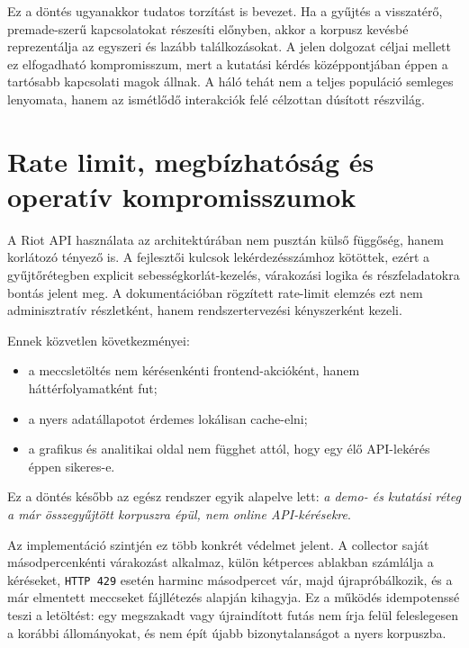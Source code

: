 ﻿\documentclass[a4paper,12pt]{report}
\begin{document}
Ez a döntés ugyanakkor tudatos torzítást is bevezet. Ha a gyűjtés a visszatérő, premade-szerű kapcsolatokat részesíti előnyben, akkor a korpusz kevésbé reprezentálja az egyszeri és lazább találkozásokat. A jelen dolgozat céljai mellett ez elfogadható kompromisszum, mert a kutatási kérdés középpontjában éppen a tartósabb kapcsolati magok állnak. A háló tehát nem a teljes populáció semleges lenyomata, hanem az ismétlődő interakciók felé célzottan dúsított részvilág.

\section{Rate limit, megbízhatóság és operatív kompromisszumok}

A Riot API használata az architektúrában nem pusztán külső függőség, hanem korlátozó tényező is. A fejlesztői kulcsok lekérdezésszámhoz kötöttek, ezért a gyűjtőrétegben explicit sebességkorlát-kezelés, várakozási logika és részfeladatokra bontás jelent meg. A dokumentációban rögzített rate-limit elemzés ezt nem adminisztratív részletként, hanem rendszertervezési kényszerként kezeli.

Ennek közvetlen következményei:

\begin{itemize}
    \item a meccsletöltés nem kérésenkénti frontend-akcióként, hanem háttérfolyamatként fut;
    \item a nyers adatállapotot érdemes lokálisan cache-elni;
    \item a grafikus és analitikai oldal nem függhet attól, hogy egy élő API-lekérés éppen sikeres-e.
\end{itemize}

Ez a döntés később az egész rendszer egyik alapelve lett: \emph{a demo- és kutatási réteg a már összegyűjtött korpuszra épül, nem online API-kérésekre}.

Az implementáció szintjén ez több konkrét védelmet jelent. A collector saját másodpercenkénti várakozást alkalmaz, külön kétperces ablakban számlálja a kéréseket, \texttt{HTTP 429} esetén harminc másodpercet vár, majd újrapróbálkozik, és a már elmentett meccseket fájllétezés alapján kihagyja. Ez a működés idempotenssé teszi a letöltést: egy megszakadt vagy újraindított futás nem írja felül feleslegesen a korábbi állományokat, és nem épít újabb bizonytalanságot a nyers korpuszba.
\end{document}
